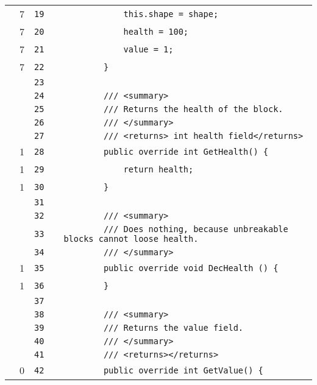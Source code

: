 \documentclass[a4paper,landscape,10pt]{article}
\begin{document}
\begin{longtable}[l]{lrrll}
\cellcolor{green} & 7 & \verb~19~ & & \verb~            this.shape = shape;~\\
\cellcolor{green} & 7 & \verb~20~ & & \verb~            health = 100;~\\
\cellcolor{green} & 7 & \verb~21~ & & \verb~            value = 1;~\\
\cellcolor{green} & 7 & \verb~22~ & & \verb~        }~\\
\cellcolor{gray} &  & \verb~23~ & & \verb~~\\
\cellcolor{gray} &  & \verb~24~ & & \verb~        /// <summary>~\\
\cellcolor{gray} &  & \verb~25~ & & \verb~        /// Returns the health of the block.~\\
\cellcolor{gray} &  & \verb~26~ & & \verb~        /// </summary>~\\
\cellcolor{gray} &  & \verb~27~ & & \verb~        /// <returns> int health field</returns>~\\
\cellcolor{green} & 1 & \verb~28~ & & \verb~        public override int GetHealth() {~\\
\cellcolor{green} & 1 & \verb~29~ & & \verb~            return health;~\\
\cellcolor{green} & 1 & \verb~30~ & & \verb~        }~\\
\cellcolor{gray} &  & \verb~31~ & & \verb~~\\
\cellcolor{gray} &  & \verb~32~ & & \verb~        /// <summary>~\\
\cellcolor{gray} &  & \verb~33~ & & \verb~        /// Does nothing, because unbreakable blocks cannot loose health.~\\
\cellcolor{gray} &  & \verb~34~ & & \verb~        /// </summary>~\\
\cellcolor{green} & 1 & \verb~35~ & & \verb~        public override void DecHealth () {~\\
\cellcolor{green} & 1 & \verb~36~ & & \verb~        }~\\
\cellcolor{gray} &  & \verb~37~ & & \verb~~\\
\cellcolor{gray} &  & \verb~38~ & & \verb~        /// <summary>~\\
\cellcolor{gray} &  & \verb~39~ & & \verb~        /// Returns the value field.~\\
\cellcolor{gray} &  & \verb~40~ & & \verb~        /// </summary>~\\
\cellcolor{gray} &  & \verb~41~ & & \verb~        /// <returns></returns>~\\
\cellcolor{red} & 0 & \verb~42~ & & \verb~        public override int GetValue() {~\\

\end{longtable}
\end{document}
